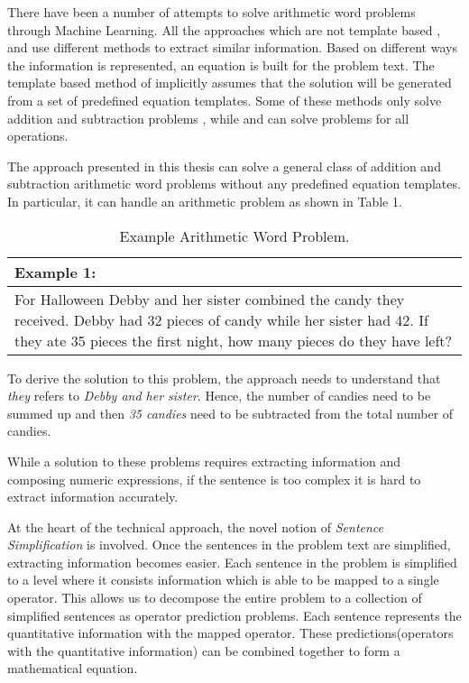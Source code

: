 \documentclass[11pt]{article}
\begin{document}
There have been a number of attempts to solve arithmetic word problems through Machine Learning. 
All the approaches which are not template based \citep{ARIS}, \citep{RoyTACL15} and \citep{RoyR15} use different methods to extract similar information. Based on different ways the information is represented, an equation is built for the problem text. The template based method of \citep{Kushman} implicitly assumes that the solution will be generated from a set of predefined equation templates. Some of these methods only solve addition and subtraction problems \citep{ARIS}, \citep{RoyTACL15} while \citep{RoyR15} and \citep{Kushman} can solve problems for all operations.

The approach presented in this thesis can solve a general class of addition and subtraction arithmetic word problems without any predefined equation templates. In particular, it can handle an arithmetic problem as shown in Table 1.

\begin{table}[h!]
\centering
\begin{tabular}{ | m{25em} | }
\hline
Example 1:\\
\hline
For Halloween Debby and her sister combined the candy they received. Debby had 32 pieces of candy while her sister had 42. If they ate 35 pieces the first night, how many pieces do they have left?\\
\hline
\end{tabular}
\caption{Example Arithmetic Word Problem.}
\label{table:1}
\end{table}

To derive the solution to this problem, the approach needs to understand that \textit{they} refers to \textit{Debby and her sister}. Hence, the number of candies need to be summed up and then \textit{35 candies} need to be subtracted from the total number of candies. 

While a solution to these problems requires extracting information and composing numeric expressions, if the sentence is too complex it is hard to extract information accurately.

At the heart of the technical approach, the novel notion of \textit{Sentence Simplification} is involved. Once the sentences in the problem text are simplified, extracting information becomes easier. Each sentence in the problem is simplified to a level where it consists information which is able to be mapped to a single operator. This allows us to decompose the entire problem to a collection of simplified sentences as operator prediction problems. Each sentence represents the quantitative information with the mapped operator. These predictions(operators with the quantitative information) can be combined together to form a mathematical equation.
\end{document}
